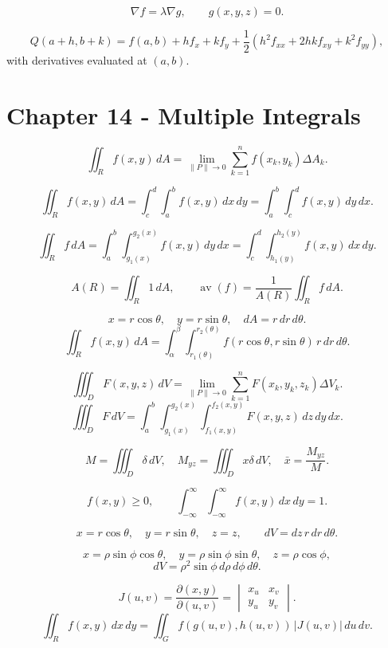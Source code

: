 \[
  \nabla f=\lambda\nabla g,
  \qquad
  g(x,y,z)=0.
\]

\[
  Q(a+h,b+k)
  =
  f(a,b)+h f_x+k f_y
  +\frac12\left(h^2f_{xx}+2hkf_{xy}+k^2f_{yy}\right),
\]
with derivatives evaluated at \((a,b)\).

\section*{Chapter 14 - Multiple Integrals}

\[
  \iint_R f(x,y)\,dA
  =
  \lim_{\|P\|\to0}\sum_{k=1}^{n}f(x_k,y_k)\Delta A_k.
\]

\[
  \iint_R f(x,y)\,dA
  =
  \int_c^d\int_a^b f(x,y)\,dx\,dy
  =
  \int_a^b\int_c^d f(x,y)\,dy\,dx.
\]

\[
  \iint_R f\,dA
  =
  \int_a^b\int_{g_1(x)}^{g_2(x)}f(x,y)\,dy\,dx
  =
  \int_c^d\int_{h_1(y)}^{h_2(y)}f(x,y)\,dx\,dy.
\]

\[
  A(R)=\iint_R1\,dA,
  \qquad
  \operatorname{av}(f)=\frac1{A(R)}\iint_R f\,dA.
\]

\[
  x=r\cos\theta,\quad y=r\sin\theta,\quad dA=r\,dr\,d\theta.
\]
\[
  \iint_R f(x,y)\,dA
  =
  \int_\alpha^\beta\int_{r_1(\theta)}^{r_2(\theta)}
  f(r\cos\theta,r\sin\theta)\,r\,dr\,d\theta.
\]

\[
  \iiint_D F(x,y,z)\,dV
  =
  \lim_{\|P\|\to0}\sum_{k=1}^{n}F(x_k,y_k,z_k)\Delta V_k.
\]
\[
  \iiint_D F\,dV
  =
  \int_a^b\int_{g_1(x)}^{g_2(x)}
  \int_{f_1(x,y)}^{f_2(x,y)}
  F(x,y,z)\,dz\,dy\,dx.
\]

\[
  M=\iiint_D\delta\,dV,
  \quad
  M_{yz}=\iiint_Dx\delta\,dV,
  \quad
  \bar x=\frac{M_{yz}}M.
\]

\[
  f(x,y)\ge0,
  \qquad
  \int_{-\infty}^{\infty}\int_{-\infty}^{\infty}f(x,y)\,dx\,dy=1.
\]

\[
  x=r\cos\theta,\quad y=r\sin\theta,\quad z=z,
  \qquad
  dV=dz\,r\,dr\,d\theta.
\]

\[
  x=\rho\sin\phi\cos\theta,\quad
  y=\rho\sin\phi\sin\theta,\quad
  z=\rho\cos\phi,
\]
\[
  dV=\rho^2\sin\phi\,d\rho\,d\phi\,d\theta.
\]

\[
  J(u,v)=
  \frac{\partial(x,y)}{\partial(u,v)}
  =
  \begin{vmatrix}
    x_u & x_v\\
    y_u & y_v
  \end{vmatrix}.
\]
\[
  \iint_R f(x,y)\,dx\,dy
  =
  \iint_G f(g(u,v),h(u,v))\,|J(u,v)|\,du\,dv.
\]
